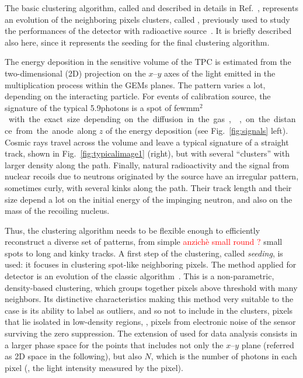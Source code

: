 The basic clustering algorithm, called \dbscan and  described in 
details in Ref.~\cite{iDBSCAN}, represents an evolution of the
neighboring pixels clusters, called \nnc, previously used to study the
performances of the \lemon detector with \fe radioactive
source~\cite{bib:fe55}. It is briefly described also here, since it
represents the seeding for the final clustering algorithm.

The energy deposition in the sensitive volume of the TPC is estimated
from the two-dimensional (2D) projection on the $x$--$y$ axes of the
light emitted in the multiplication process within the GEMs
planes. The pattern varies a lot, depending on the interacting
particle. For events of  \fe calibration source, the signature of
the typical 5.9\keV photons is a spot of few\unit{mm$^2$} with the exact
size depending on the diffusion in the gas, \ie, on the distance from the anode along $z$ of
the energy deposition  (see  Fig.~\ref{fig:signals}
 left). Cosmic rays travel across the volume and leave a typical
signature of a straight track, shown in Fig.~\ref{fig:typicalimage1}
(right), but with several ``clusters'' with larger density along the
path. Finally, natural radioactivity and the signal
from nuclear recoils due to neutrons originated by the \ambe source have
an irregular pattern, sometimes curly, with several kinks along the
path. Their track length and their size depend a lot on the initial energy of
the impinging neutron, and also on the mass of the recoiling nucleus.

Thus, the clustering algorithm needs to be flexible enough to
efficiently reconstruct a diverse set of patterns, from simple \textcolor{red}{anzichè small round ? } small 
spots  to long and kinky tracks. A first step of the
clustering, called \textit{seeding}, is used: it  focuses in
clustering spot-like neighboring pixels.  The method applied for \lemon
detector is an evolution of the classic \dbscan
algorithm~\cite{dbscan}.  This is a non-parametric, density-based
clustering, which groups together pixels above threshold with
many neighbors. Its distinctive characteristics making this method
very suitable to the \lemon case is its ability to  label as
outliers, and so not to include in the clusters, pixels that lie isolated in
low-density regions, \ie, pixels from electronic noise of the sensor
surviving the  zero suppression. The extension of \dbscan used
for \lemon data analysis consists in a larger phase space for the points  that includes  not only  the
$x$--$y$ plane (referred as 2D space in the following), but also
$N$, which is the number of photons in each pixel (\ie, the light
intensity measured by the pixel).

